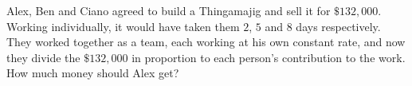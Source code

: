 Alex, Ben and Ciano agreed to build a Thingamajig and sell it for $\$132{,}000$. Working individually, it would have taken them $2$, $5$ and $8$ days respectively. They worked together as a team, each working at his own constant rate, and now they divide the $\$132{,}000$ in proportion to each person's contribution to the work. How much money should Alex get?

